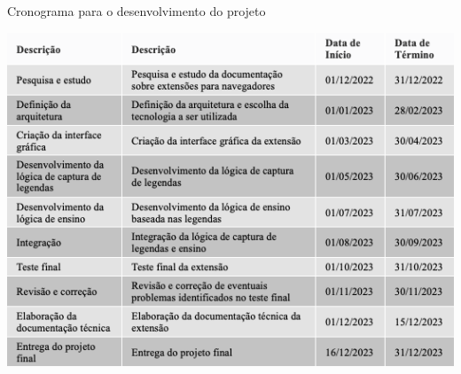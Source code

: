 \documentclass[12pt]{article}
\begin{document}
\begin{table}[ht]
\centering
\caption{Cronograma para o desenvolvimento do projeto }
\label{tab:exTable1}
\includegraphics[width=.7\textwidth]{table.png}
\end{table}
\end{document}
